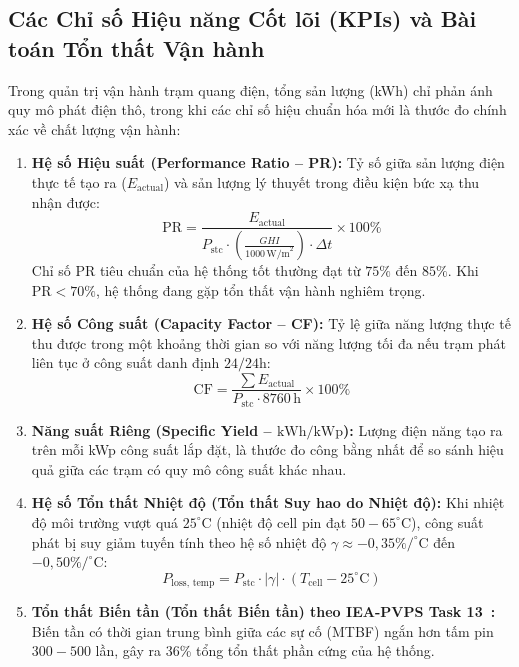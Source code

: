 \subsection{Các Chỉ số Hiệu năng Cốt lõi (KPIs) và Bài toán Tổn thất Vận hành}
Trong quản trị vận hành trạm quang điện, tổng sản lượng (kWh) chỉ phản ánh quy mô phát điện thô, trong khi các chỉ số hiệu chuẩn hóa mới là thước đo chính xác về chất lượng vận hành:
\begin{enumerate}[label=\arabic*., leftmargin=*]
    \item \textbf{Hệ số Hiệu suất (Performance Ratio -- PR):} Tỷ số giữa sản lượng điện thực tế tạo ra ($E_{\text{actual}}$) và sản lượng lý thuyết trong điều kiện bức xạ thu nhận được:
    \begin{equation}
        \text{PR} = \frac{E_{\text{actual}}}{P_{\text{stc}} \cdot \left(\frac{GHI}{1000\,\text{W/m}^2}\right) \cdot \Delta t} \times 100\%
    \end{equation}
    Chỉ số PR tiêu chuẩn của hệ thống tốt thường đạt từ $75\%$ đến $85\%$. Khi $\text{PR} < 70\%$, hệ thống đang gặp tổn thất vận hành nghiêm trọng.
    
    \item \textbf{Hệ số Công suất (Capacity Factor -- CF):} Tỷ lệ giữa năng lượng thực tế thu được trong một khoảng thời gian so với năng lượng tối đa nếu trạm phát liên tục ở công suất danh định $24/24\text{h}$:
    \begin{equation}
        \text{CF} = \frac{\sum E_{\text{actual}}}{P_{\text{stc}} \cdot 8760\,\text{h}} \times 100\%
    \end{equation}
    
    \item \textbf{Năng suất Riêng (Specific Yield -- $\text{kWh/kWp}$):} Lượng điện năng tạo ra trên mỗi kWp công suất lắp đặt, là thước đo công bằng nhất để so sánh hiệu quả giữa các trạm có quy mô công suất khác nhau.

    \item \textbf{Hệ số Tổn thất Nhiệt độ (Tổn thất Suy hao do Nhiệt độ):} Khi nhiệt độ môi trường vượt quá $25^\circ\text{C}$ (nhiệt độ cell pin đạt $50-65^\circ\text{C}$), công suất phát bị suy giảm tuyến tính theo hệ số nhiệt độ $\gamma \approx -0{,}35\%/^\circ\text{C}$ đến $-0{,}50\%/^\circ\text{C}$:
    \begin{equation}
        P_{\text{loss, temp}} = P_{\text{stc}} \cdot |\gamma| \cdot (T_{\text{cell}} - 25^\circ\text{C})
    \end{equation}
    
    \item \textbf{Tổn thất Biến tần (Tổn thất Biến tần) theo IEA-PVPS Task 13~\cite{iea2023pvps}:} Biến tần có thời gian trung bình giữa các sự cố (MTBF) ngắn hơn tấm pin $300-500$ lần, gây ra 36\% tổng tổn thất phần cứng của hệ thống.
\end{enumerate}

